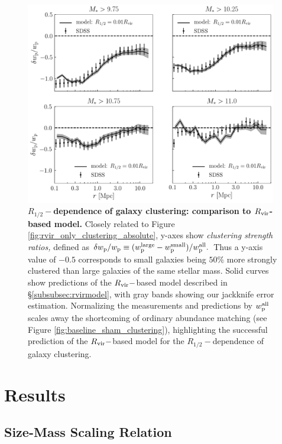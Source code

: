 \documentclass[usenatbib,usegraphicx,letterpaper]{mn2e}
\newcommand{\rhalf}{R_{1/2}}
\newcommand{\rvir}{R_{\rm vir}}
\newcommand{\wproj}{w_{\rm p}}
\begin{document}
\begin{figure}
\centering
\includegraphics[width=11cm]{FIGS/rvir_only_wp_ratios.pdf}
\caption{
{\bf $\rhalf-$dependence of galaxy clustering: comparison to $\rvir$-based model.}
Closely related to Figure \ref{fig:rvir_only_clustering_absolute}, y-axes show {\em clustering strength ratios,} defined as $\delta\wproj/\wproj\equiv(w_{\rm p}^{\rm large} - w_{\rm p}^{\rm small})/w_{\rm p}^{\rm all}.$ Thus a y-axis value of $-0.5$ corresponds to small galaxies being $50\%$ more strongly clustered than large galaxies of the same stellar mass. Solid curves show predictions of the $\rvir-$based model described in \S\ref{subsubsec:rvirmodel}, with gray bands showing our jackknife error estimation. Normalizing the measurements and predictions by $w_{\rm p}^{\rm all}$ scales away the shortcoming of ordinary abundance matching (see Figure \ref{fig:baseline_sham_clustering}), highlighting the successful prediction of the $\rvir-$based model for the $\rhalf-$dependence of galaxy clustering.
}
\label{fig:clustering_ratio_upshot}
\end{figure}

\section{Results}
\label{sec:results}

\subsection{Size-Mass Scaling Relation}
\label{subsec:one_point_function}
\end{document}
